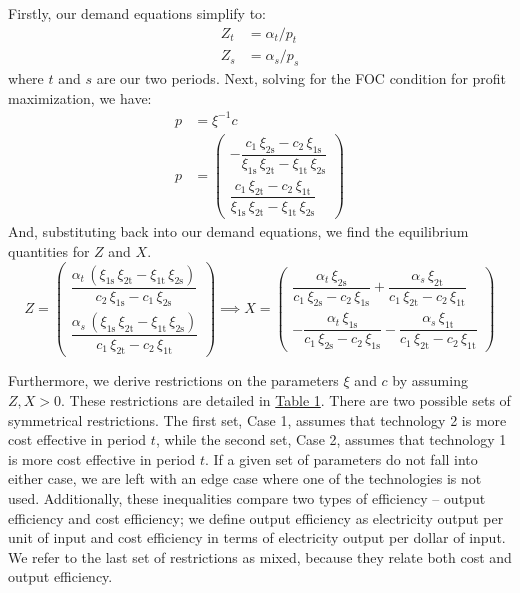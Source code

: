 \documentclass[11pt,a4paper]{extarticle}
\begin{document}
Firstly, our demand equations simplify to:
\begin{align}
Z_t &= \alpha_t / p_t \\
Z_s &= \alpha_s / p_s
\end{align}
where $t$ and $s$ are our two periods. Next, solving for the FOC condition for profit maximization, we have:
\begin{align*}
p &=  \xi^{-1} c \\
p &= \begin{pmatrix}
-\dfrac{c_{1}\,\xi _{\mathrm{2s}}-c_{2}\,\xi _{\mathrm{1s}}}{\xi _{\mathrm{1s}}\,\xi _{\mathrm{2t}}-\xi _{\mathrm{1t}}\,\xi _{\mathrm{2s}}}  \\[2ex]
\dfrac{c_{1}\,\xi _{\mathrm{2t}}-c_{2}\,\xi _{\mathrm{1t}}}{\xi _{\mathrm{1s}}\,\xi _{\mathrm{2t}}-\xi _{\mathrm{1t}}\,\xi _{\mathrm{2s}}} 
\end{pmatrix} 
\end{align*}
And, substituting back into our demand equations, we find the equilibrium quantities for $Z$ and $X$. 
$$
Z = \begin{pmatrix}
\dfrac{\alpha _{t}\,\left(\xi _{\mathrm{1s}}\,\xi _{\mathrm{2t}}-\xi _{\mathrm{1t}}\,\xi _{\mathrm{2s}}\right)}{c_{2}\,\xi _{\mathrm{1s}} - c_{1}\,\xi _{\mathrm{2s}}} \\[2ex]
\dfrac{\alpha _{s}\,\left(\xi _{\mathrm{1s}}\,\xi _{\mathrm{2t}}-\xi _{\mathrm{1t}}\,\xi _{\mathrm{2s}}\right)}{c_{1}\,\xi _{\mathrm{2t}}-c_{2}\,\xi _{\mathrm{1t}}} 
\end{pmatrix}
\implies 
X = \begin{pmatrix}
\dfrac{\alpha _{t}\,\xi _{\mathrm{2s}}}{c_{1}\,\xi _{\mathrm{2s}}-c_{2}\,\xi _{\mathrm{1s}}}+\dfrac{\alpha _{s}\,\xi _{\mathrm{2t}}}{c_{1}\,\xi _{\mathrm{2t}}-c_{2}\,\xi _{\mathrm{1t}}} \\[2ex] 
-\dfrac{\alpha _{t}\,\xi _{\mathrm{1s}}}{c_{1}\,\xi _{\mathrm{2s}}-c_{2}\,\xi _{\mathrm{1s}}}-\dfrac{\alpha _{s}\,\xi _{\mathrm{1t}}}{c_{1}\,\xi _{\mathrm{2t}}-c_{2}\,\xi _{\mathrm{1t}}}
\end{pmatrix}
$$

Furthermore, we derive restrictions on the parameters $\xi$ and $c$ by assuming $Z, X > 0$. These restrictions are detailed in \hyperref[tab:paramrest]{Table 1}. There are two possible sets of symmetrical restrictions. The first set, Case 1, assumes that technology 2 is more cost effective in period $t$, while the second set, Case 2, assumes that technology 1 is more cost effective in period $t$. If a given set of parameters do not fall into either case, we are left with an edge case where one of the technologies is not used. Additionally, these inequalities compare two types of efficiency -- output efficiency and cost efficiency; we define output efficiency as electricity output per unit of input and cost efficiency in terms of electricity output per dollar of input. We refer to the last set of restrictions as mixed, because they relate both cost and output efficiency. 
\end{document}
